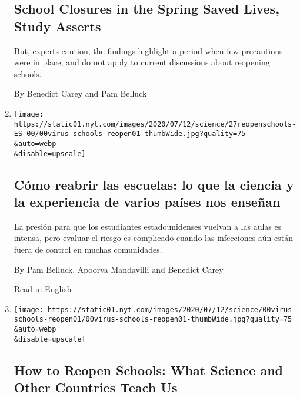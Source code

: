 \begin{enumerate}
{  \subsection{School Closures in the Spring Saved Lives, Study
  Asserts}\label{school-closures-in-the-spring-saved-lives-study-asserts}}

  But, experts caution, the findings highlight a period when few
  precautions were in place, and do not apply to current discussions
  about reopening schools.

  By Benedict Carey and Pam Belluck
\item
  \href{/es/2020/07/27/espanol/ciencia-y-tecnologia/regreso-a-clases-coronavirus.html}{}

  \texttt{[image: https://static01.nyt.com/images/2020/07/12/science/27reopenschools-ES-00/00virus-schools-reopen01-thumbWide.jpg?quality=75\\\&auto=webp\\\&disable=upscale]}

  \hypertarget{cuxf3mo-reabrir-las-escuelas-lo-que-la-ciencia-y-la-experiencia-de-varios-pauxedses-nos-enseuxf1an}{%
  \subsection{Cómo reabrir las escuelas: lo que la ciencia y la
  experiencia de varios países nos
  enseñan}\label{cuxf3mo-reabrir-las-escuelas-lo-que-la-ciencia-y-la-experiencia-de-varios-pauxedses-nos-enseuxf1an}}

  La presión para que los estudiantes estadounidenses vuelvan a las
  aulas es intensa, pero evaluar el riesgo es complicado cuando las
  infecciones aún están fuera de control en muchas comunidades.

  By Pam Belluck, Apoorva Mandavilli and Benedict Carey

  \href{https://www.nytimes.com/2020/07/11/health/coronavirus-schools-reopen.html}{Read
  in English}
\item
  \href{/2020/07/11/health/coronavirus-schools-reopen.html}{}

  \texttt{[image: https://static01.nyt.com/images/2020/07/12/science/00virus-schools-reopen01/00virus-schools-reopen01-thumbWide.jpg?quality=75\\\&auto=webp\\\&disable=upscale]}

  \hypertarget{how-to-reopen-schools-what-science-and-other-countries-teach-us}{%
  \subsection{How to Reopen Schools: What Science and Other Countries
  Teach
  Us}\label{how-to-reopen-schools-what-science-and-other-countries-teach-us}}


\end{enumerate}
